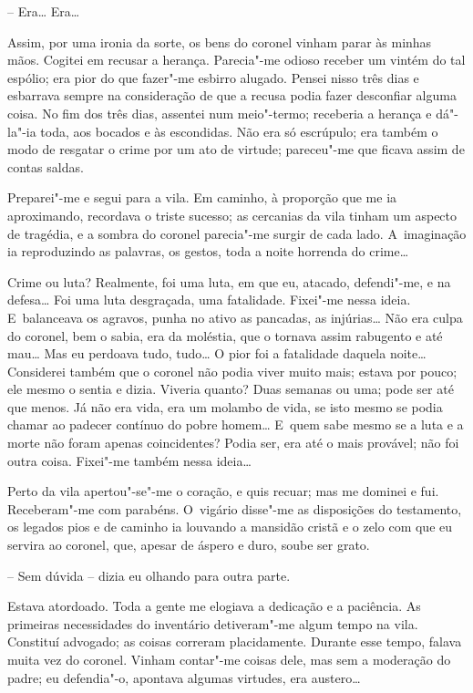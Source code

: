 -- Era\ldots{} Era\ldots{}

Assim, por uma ironia da sorte, os bens do coronel vinham parar às
minhas mãos. Cogitei em recusar a herança. Parecia"-me odioso receber um
vintém do tal espólio; era pior do que fazer"-me esbirro alugado. Pensei
nisso três dias e esbarrava sempre na consideração de que a recusa podia
fazer desconfiar alguma coisa. No fim dos três dias, assentei num
meio"-termo; receberia a herança e dá"-la"-ia toda, aos bocados e às
escondidas. Não era só escrúpulo; era também o modo de resgatar o crime
por um ato de virtude; pareceu"-me que ficava assim de contas saldas.

Preparei"-me e segui para a vila. Em caminho, à proporção que me ia
aproximando, recordava o triste sucesso; as cercanias da vila tinham um
aspecto de tragédia, e a sombra do coronel parecia"-me surgir de cada
lado. A~imaginação ia reproduzindo as palavras, os gestos, toda a noite
horrenda do crime\ldots{}

Crime ou luta? Realmente, foi uma luta, em que eu, atacado, defendi"-me,
e na defesa\ldots{} Foi uma luta desgraçada, uma fatalidade. Fixei"-me nessa
ideia. E~balanceava os agravos, punha no ativo as pancadas, as
injúrias\ldots{} Não era culpa do coronel, bem o sabia, era da moléstia, que
o tornava assim rabugento e até mau\ldots{} Mas eu perdoava tudo, tudo\ldots{} O
pior foi a fatalidade daquela noite\ldots{} Considerei também que o coronel
não podia viver muito mais; estava por pouco; ele mesmo o sentia e
dizia. Viveria quanto? Duas semanas ou uma; pode ser até que menos. Já
não era vida, era um molambo de vida, se isto mesmo se podia chamar ao
padecer contínuo do pobre homem\ldots{} E~quem sabe mesmo se a luta e a morte
não foram apenas coincidentes? Podia ser, era até o mais provável; não
foi outra coisa. Fixei"-me também nessa ideia\ldots{}

Perto da vila apertou"-se"-me o coração, e quis recuar; mas me dominei e
fui. Receberam"-me com parabéns. O~vigário disse"-me as disposições do
testamento, os legados pios e de caminho ia louvando a mansidão cristã e
o zelo com que eu servira ao coronel, que, apesar de áspero e duro,
soube ser grato.

-- Sem dúvida -- dizia eu olhando para outra parte.

Estava atordoado. Toda a gente me elogiava a dedicação e a paciência. As
primeiras necessidades do inventário detiveram"-me algum tempo na vila.
Constituí advogado; as coisas correram placidamente. Durante esse tempo,
falava muita vez do coronel. Vinham contar"-me coisas dele, mas sem a
moderação do padre; eu defendia"-o, apontava algumas virtudes, era
austero\ldots{}

